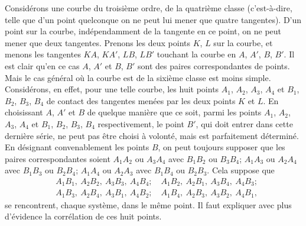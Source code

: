 \documentclass[12pt,a4paper]{article}
\begin{document}
Consid\'erons une courbe du troisi\`eme ordre, de la quatri\`eme classe (c'est-\`a-dire, telle que d'un point quelconque on ne peut lui mener que quatre tangentes). D'un point sur la courbe, ind\'ependamment de la tangente en ce point, on ne peut mener que deux tangentes. Prenons les deux points $K$, $L$ sur la courbe, et menons les tangentes $KA$, $KA'$, $LB$, $LB'$ touchant la courbe en $A$, $A'$, $B$, $B'$. Il est clair qu'en ce cas $A$, $A'$ et $B$, $B'$ sont des paires correspondantes de points. Mais le cas g\'en\'eral o\`u la courbe est de la sixi\`eme classe est moins simple. Consid\'erons, en effet, pour une telle courbe, les huit points $A_1$, $A_2$, $A_3$, $A_4$ et $B_1$, $B_2$, $B_3$, $B_4$ de contact des tangentes men\'ees par les deux points $K$ et $L$. En choisissant $A$, $A'$ et $B$ de quelque mani\`ere que ce soit, parmi les points $A_1$, $A_2$, $A_3$, $A_4$ et $B_1$, $B_2$, $B_3$, $B_4$ respectivement, le point $B'$, qui doit entrer dans cette derni\`ere s\'erie, ne peut pas \^etre choisi \`a volont\'e, mais est parfaitement d\'etermin\'e. En d\'esignant convenablement les points $B$, on peut toujours supposer que les paires correspondantes soient $A_1 A_2$ ou $A_3 A_4$ avec $B_1 B_2$ ou $B_3 B_4$; $A_1 A_3$ ou $A_2 A_4$ avec $B_1 B_3$ ou $B_2 B_4$; $A_1 A_4$ ou $A_2 A_3$ avec $B_1 B_4$ ou $B_2 B_3$. Cela suppose que
\begin{align*}
&A_1 B_1,\ A_2 B_2,\ A_3 B_3,\ A_4 B_4;\quad A_1 B_2,\ A_2 B_1,\ A_3 B_4,\ A_4 B_3;\\
&A_1 B_3,\ A_2 B_4,\ A_3 B_1,\ A_4 B_2;\quad A_1 B_4,\ A_2 B_3,\ A_3 B_2,\ A_4 B_1,
\end{align*}
se rencontrent, chaque syst\`eme, dans le m\^eme point. Il faut expliquer avec plus d'\'evidence la corr\'elation de ces huit points.
\end{document}
